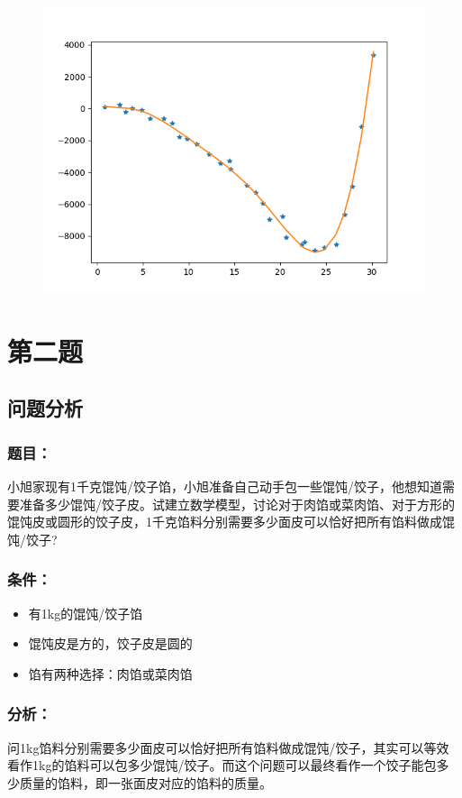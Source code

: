 \documentclass[lang=cn,a4paper]{elegantpaper}
\begin{document}
    \begin{figure}[H]
        \includegraphics[scale=0.4]{1-7.png}
    \end{figure}
    \clearpage

    \section{第二题}
    \subsection{问题分析}
    \subsubsection*{题目：}
    小旭家现有1千克馄饨/饺子馅，小旭准备自己动手包一些馄饨/饺子，他想知道需要准备多少馄饨/饺子皮。试建立数学模型，讨论对于肉馅或菜肉馅、对于方形的馄饨皮或圆形的饺子皮，1千克馅料分别需要多少面皮可以恰好把所有馅料做成馄饨/饺子?
    \subsubsection*{条件：}
    \begin{itemize}
        \item 有1kg的馄饨/饺子馅
        \item 馄饨皮是方的，饺子皮是圆的
        \item 馅有两种选择：肉馅或菜肉馅
    \end{itemize}
    \subsubsection*{分析：}
    问1kg馅料分别需要多少面皮可以恰好把所有馅料做成馄饨/饺子，其实可以等效看作1kg的馅料可以包多少馄饨/饺子。而这个问题可以最终看作一个饺子能包多少质量的馅料，即一张面皮对应的馅料的质量。
\end{document}
